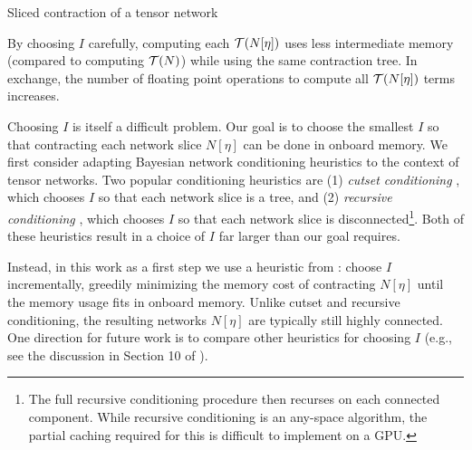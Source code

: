 \begin{algorithm*}[t]
    \label{alg:tn-sliced}
    \caption{Sliced contraction of a tensor network}
    \DontPrintSemicolon
\end{algorithm*}

By choosing $I$ carefully, computing each $\mathcal{T}(N[\eta])$ uses less intermediate memory (compared to computing $\mathcal{T}(N)$) while using the same contraction tree. In exchange, the number of floating point operations to compute all $\mathcal{T}(N[\eta])$ terms increases. 

Choosing $I$ is itself a difficult problem. Our goal is to choose the smallest $I$ so that contracting each network slice $N[\eta]$ can be done in onboard memory. We first consider adapting Bayesian network conditioning heuristics to the context of tensor networks. Two popular conditioning heuristics are (1) \emph{cutset conditioning} \cite{pearl86}, which chooses $I$ so that each network slice is a tree, and (2) \emph{recursive conditioning} \cite{darwiche01}, which chooses $I$ so that each network slice is disconnected\footnote{The full recursive conditioning procedure then recurses on each connected component. While recursive conditioning is an any-space algorithm, the partial caching required for this is difficult to implement on a GPU.}. Both of these heuristics result in a choice of $I$ far larger than our goal requires. 


Instead, in this work as a first step we use a heuristic from \cite{CZHNS18,GK20}: choose $I$ incrementally, greedily minimizing the memory cost of contracting $N[\eta]$ until the memory usage fits in onboard memory. Unlike cutset and recursive conditioning, the resulting networks $N[\eta]$ are typically still highly connected. One direction for future work is to compare other heuristics for choosing $I$ (e.g., see the discussion in Section 10 of \cite{dechter99}).

